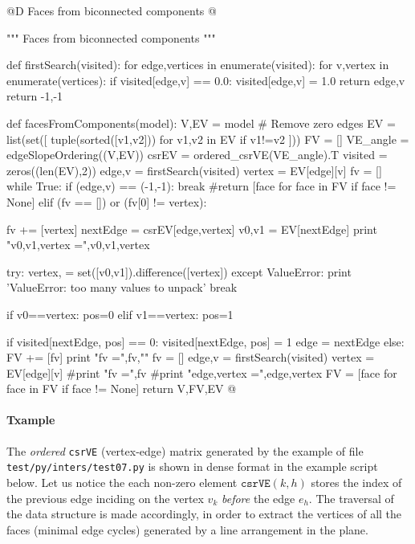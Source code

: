\documentclass[11pt,oneside]{article}    %
\begin{document}
@D Faces from biconnected components
@{""" Faces from biconnected components """

def firstSearch(visited):
    for edge,vertices in enumerate(visited):
        for v,vertex in enumerate(vertices):
            if visited[edge,v] == 0.0:
                visited[edge,v] = 1.0
                return edge,v
    return -1,-1

def facesFromComponents(model):
    V,EV = model
    # Remove zero edges
    EV = list(set([ tuple(sorted([v1,v2])) for v1,v2 in EV if v1!=v2 ]))
    FV = []
    VE_angle = edgeSlopeOrdering((V,EV))
    csrEV = ordered_csrVE(VE_angle).T
    visited = zeros((len(EV),2))
    edge,v = firstSearch(visited)
    vertex = EV[edge][v]
    fv = []
    while True:
        if (edge,v) == (-1,-1):
            break #return [face for face in FV if face != None]
        elif (fv == []) or (fv[0] != vertex):
            
            fv += [vertex]
            nextEdge = csrEV[edge,vertex]
            v0,v1 = EV[nextEdge]
            print "v0,v1,vertex =",v0,v1,vertex
            
            try:
                vertex, = set([v0,v1]).difference([vertex])
            except ValueError:
                print 'ValueError: too many values to unpack'
                break
                
            if v0==vertex: pos=0
            elif v1==vertex: pos=1
                        
            if visited[nextEdge, pos] == 0:
                visited[nextEdge, pos] = 1
                edge = nextEdge                
        else:
            FV += [fv]
            print "fv =",fv,"\n"
            fv = []
            edge,v = firstSearch(visited)
            vertex = EV[edge][v]
        #print "fv =",fv
        #print "edge,vertex =",edge,vertex
        FV = [face for face in FV if face != None]
    return V,FV,EV
@}

\paragraph{Txample}
The \emph{ordered} \texttt{csrVE} (vertex-edge) matrix generated by the example of file \texttt{test/py/inters/test07.py} is shown in dense format in the example script below.
Let us notice the each non-zero element $\texttt{csrVE}(k,h)$ stores the index of the previous edge 
inciding on the vertex $v_k$ \emph{before} the edge $e_h$. The traversal of the data structure is made accordingly, in order to extract the vertices of all the faces (minimal edge cycles) generated by a line arrangement in the plane.
\end{document}
